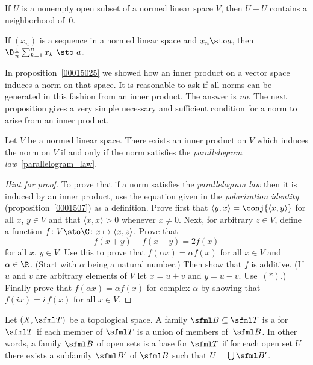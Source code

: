 \begin{cor} If $U$ is a nonempty open subset of a normed linear space $V$, then $U - U$
contains a neighborhood of~$0$.
\end{cor}

\begin{prop} If $(x_n)$ is a sequence in a normed linear space and $x_n \sto a$, then
$\D\frac1n\sum_{k=1}^nx_k~\sto~a$.
\end{prop}

In proposition~\ref{00015025} we showed how an inner product on a vector space induces a norm on that space.
It is reasonable to ask if all norms can be generated in this fashion from an inner product.  The answer
is \emph{no}.  The next proposition gives a very simple necessary and sufficient condition for a norm to
arise from an inner product.

\begin{prop} Let $V$ be a normed linear space.  There exists an inner product on $V$ which induces the
norm on $V$ if and only if the norm satisfies the \emph{parallelogram law}~\ref{parallelogram_law}.
\end{prop}

\begin{proof}[\emph{Hint for proof}]  To prove that if a norm satisfies the \emph{parallelogram law}
then it is induced by an inner product, use the equation given in the \emph{polarization identity}
(proposition~\ref{0001507}) as a definition.  Prove first that $\langle y,x \rangle = \conj{\langle x,y \rangle}$
for all $x$, $y\in V$ and that $\langle x,x \rangle > 0$ whenever $x \ne 0$.  Next, for arbitrary
$z \in V$, define a function $f\colon V \sto \C\colon x \mapsto \langle x,z \rangle$.  Prove that
   \[ f(x + y) + f(x - y) = 2f(x) \tag{$\ast$} \]
for all $x$, $y \in V$.  Use this to prove that $f(\alpha x) = \alpha f(x)$ for all $x \in V$ and $\alpha \in \R$.
(Start with $\alpha$ being a natural number.)  Then show that $f$ is additive. (If $u$ and $v$ are arbitrary
elements of $V$ let $x = u + v$ and $y = u - v$.  Use~$(\ast)$.)  Finally prove that $f(\alpha x) = \alpha f(x)$
for complex $\alpha$ by showing that $f(ix) = i\,f(x)$ for all $x \in V$.  \ns
\end{proof}

\begin{defn} Let $(X,\sfml T)$ be a topological space. A family $\sfml B \subseteq \sfml T$
is a
 for $\sfml T$ if each member of $\sfml T$ is a union of members of~$\sfml B$.
In other words, a family $\sfml B$ of open sets is a base for $\sfml T$ if for each open
set $U$ there exists a subfamily $\sfml B'$ of $\sfml B$ such that $U = \bigcup \sfml B'$.
\end{defn}

